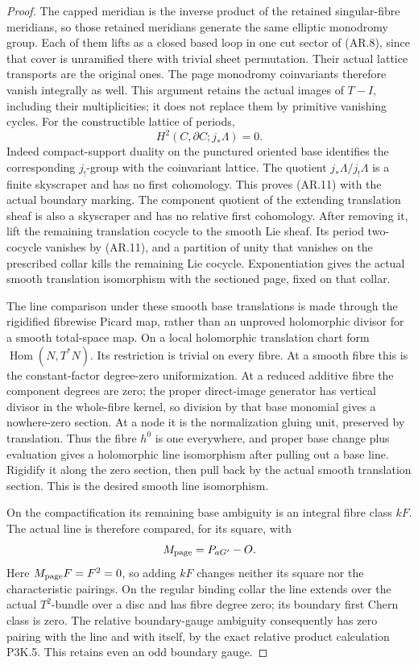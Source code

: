 \begin{proof}
The capped meridian is the inverse product of the retained
singular-fibre meridians, so those retained meridians generate
the same elliptic monodromy group. Each of them lifts as a
closed based loop in one cut sector of (AR.8), since that
cover is unramified there with trivial sheet permutation.
Their actual lattice transports are the original ones.
The page monodromy coinvariants therefore vanish integrally
as well. This argument retains the actual images of
\(T-I\), including their multiplicities; it does not replace
them by primitive vanishing cycles. For the constructible
lattice of periods,
\[
 H^2(C,\partial C;j_*\Lambda)=0.                       \tag{AR.11}
\]
Indeed compact-support duality on the punctured oriented base
identifies the corresponding \(j_!\)-group with the coinvariant
lattice. The quotient \(j_*\Lambda/j_!\Lambda\) is a finite
skyscraper and has no first cohomology. This proves (AR.11)
with the actual boundary marking. The component quotient of the
extending translation sheaf is also a skyscraper and has no
relative first cohomology. After removing it, lift the remaining
translation cocycle to the smooth Lie sheaf. Its period
two-cocycle vanishes by (AR.11), and a partition of unity that
vanishes on the prescribed collar kills the remaining Lie
cocycle. Exponentiation gives the actual smooth translation
isomorphism with the sectioned page, fixed on that collar.

The line comparison under these smooth base translations is
made through the rigidified fibrewise Picard map, rather than
an unproved holomorphic divisor for a smooth total-space map.
On a local holomorphic translation chart form
\(\operatorname{Hom}(N,T^*N)\). Its restriction is trivial on
every fibre. At a smooth fibre this is the constant-factor
degree-zero uniformization. At a reduced additive fibre the
component degrees are zero; the proper direct-image generator
has vertical divisor in the whole-fibre kernel, so division by
that base monomial gives a nowhere-zero section. At a node it
is the normalization gluing unit, preserved by translation.
Thus the fibre \(h^0\) is one everywhere, and proper base
change plus evaluation gives a holomorphic line isomorphism
after pulling out a base line. Rigidify it along the zero
section, then pull back by the actual smooth translation
section. This is the desired smooth line isomorphism.

On the compactification its remaining base ambiguity is an
integral fibre class \(kF\). The actual line is therefore
compared, for its square, with
\[
                         M_{\rm page}=P_{aG'}-O.
\]
Here \(M_{\rm page}F=F^2=0\), so adding \(kF\) changes
neither its square nor the characteristic pairings. On the
regular binding collar the line extends over the actual
\(T^2\)-bundle over a disc and has fibre degree zero; its
boundary first Chern class is zero. The relative boundary-gauge
ambiguity consequently has zero pairing with the line and
with itself, by the exact relative product calculation P3K.5.
This retains even an odd boundary gauge.


\end{proof}
